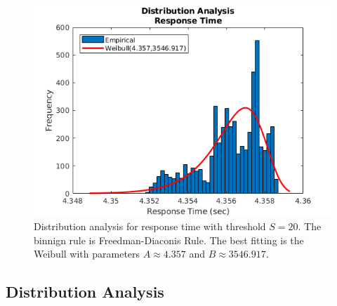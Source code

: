 \begin{figure}
	\includegraphics[width=\columnwidth]{fig/evaluation-distribution-analysis-response-time}
	\caption{Distribution analysis for response time with threshold $S=20$. The binnign rule is Freedman-Diaconis Rule. The best fitting is the Weibull with parameters $A\approx4.357$ and $B\approx3546.917$.}
	\label{fig:evaluation-distribution-analysis-response-time}
\end{figure}

\subsection{Distribution Analysis}
\label{sec:evaluation-distribution-analysis}